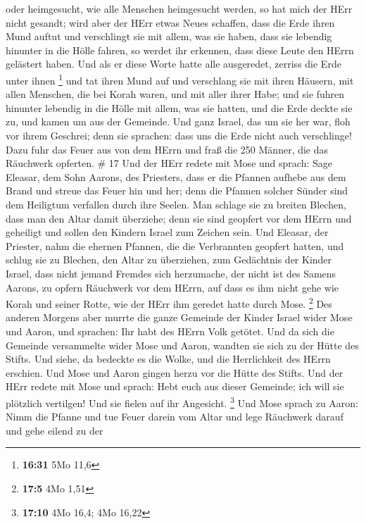 oder heimgesucht, wie alle Menschen heimgesucht werden, so hat mich der
HErr nicht gesandt;  wird aber der HErr etwas Neues
schaffen, dass die Erde ihren Mund auftut und verschlingt sie mit allem,
was sie haben, dass sie lebendig hinunter in die Hölle fahren, so werdet
ihr erkennen, dass diese Leute den HErrn gelästert haben. 
Und als er diese Worte hatte alle ausgeredet, zerriss die Erde unter
ihnen \footnote{\textbf{16:31} 5Mo 11,6}  und tat ihren
Mund auf und verschlang sie mit ihren Häusern, mit allen Menschen, die
bei Korah waren, und mit aller ihrer Habe;  und sie fuhren
hinunter lebendig in die Hölle mit allem, was sie hatten, und die Erde
deckte sie zu, und kamen um aus der Gemeinde.  Und ganz
Israel, das um sie her war, floh vor ihrem Geschrei; denn sie sprachen:
dass uns die Erde nicht auch verschlinge!  Dazu fuhr das
Feuer aus von dem HErrn und fraß die 250 Männer, die das Räuchwerk
opferten. \# 17  Und der HErr redete mit Mose und sprach:
 Sage Eleasar, dem Sohn Aarons, des Priesters, dass er die
Pfannen aufhebe aus dem Brand und streue das Feuer hin und her;
 denn die Pfannen solcher Sünder sind dem Heiligtum
verfallen durch ihre Seelen. Man schlage sie zu breiten Blechen, dass
man den Altar damit überziehe; denn sie sind geopfert vor dem HErrn und
geheiligt und sollen den Kindern Israel zum Zeichen sein. 
Und Eleasar, der Priester, nahm die ehernen Pfannen, die die Verbrannten
geopfert hatten, und schlug sie zu Blechen, den Altar zu überziehen,
 zum Gedächtnis der Kinder Israel, dass nicht jemand Fremdes
sich herzumache, der nicht ist des Samens Aarons, zu opfern Räuchwerk
vor dem HErrn, auf dass es ihm nicht gehe wie Korah und seiner Rotte,
wie der HErr ihm geredet hatte durch Mose. \footnote{\textbf{17:5} 4Mo
  1,51}  Des anderen Morgens aber murrte die ganze Gemeinde
der Kinder Israel wider Mose und Aaron, und sprachen: Ihr habt des HErrn
Volk getötet.  Und da sich die Gemeinde versammelte wider
Mose und Aaron, wandten sie sich zu der Hütte des Stifts. Und siehe, da
bedeckte es die Wolke, und die Herrlichkeit des HErrn erschien.
 Und Mose und Aaron gingen herzu vor die Hütte des Stifts.
 Und der HErr redete mit Mose und sprach:  Hebt
euch aus dieser Gemeinde; ich will sie plötzlich vertilgen! Und sie
fielen auf ihr Angesicht. \footnote{\textbf{17:10} 4Mo 16,4; 4Mo 16,22}
 Und Mose sprach zu Aaron: Nimm die Pfanne und tue Feuer
darein vom Altar und lege Räuchwerk darauf und gehe eilend zu der
